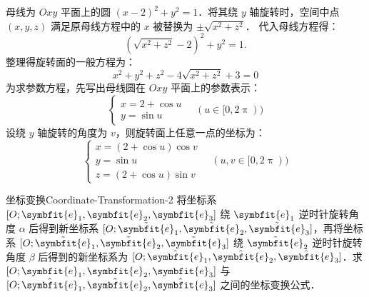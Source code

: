 \begin{solution}
    母线为 $Oxy$ 平面上的圆 $(x - 2)^2 + y^2 = 1$．将其绕 $y$ 轴旋转时，空间中点 $(x, y, z)$ 满足原母线方程中的 $x$ 被替换为 $\pm \sqrt{x^2 + z^2}$．
    代入母线方程得：
    \begin{equation}
        (\sqrt{x^2 + z^2} - 2)^2 + y^2 = 1.
    \end{equation}
    整理得旋转面的一般方程为：
    \begin{equation}
        \boxed{x^2 + y^2 + z^2 - 4\sqrt{x^2 + z^2} + 3 = 0}
    \end{equation}
    为求参数方程，先写出母线圆在 $Oxy$ 平面上的参数表示：
    \begin{equation}
        \begin{cases}
            x = 2 + \cos u \\
            y = \sin u
        \end{cases} \quad (u \in [0, 2\uppi))
    \end{equation}
    设绕 $y$ 轴旋转的角度为 $v$，则旋转面上任意一点的坐标为：
    \begin{equation}
        \boxed{\begin{cases}
            x = (2 + \cos u) \cos v \\
            y = \sin u              \\
            z = (2 + \cos u) \sin v
        \end{cases} \quad (u, v \in [0, 2\uppi))}
    \end{equation}
\end{solution}


\begin{problem}{坐标变换}{Coordinate-Transformation-2}
    将坐标系 $[O; \symbfit{e}_1, \symbfit{e}_2, \symbfit{e}_3]$ 绕 $\symbfit{e}_1$ 逆时针旋转角度 $\alpha$ 后得到新坐标系 $[O; \tilde{\symbfit{e}}_1, \tilde{\symbfit{e}}_2, \tilde{\symbfit{e}}_3]$，再将坐标系 $[O; \tilde{\symbfit{e}}_1, \tilde{\symbfit{e}}_2, \tilde{\symbfit{e}}_3]$ 绕 $\tilde{\symbfit{e}}_2$ 逆时针旋转角度 $\beta$ 后得到的新坐标系为 $[O; \hat{\symbfit{e}}_1, \hat{\symbfit{e}}_2, \hat{\symbfit{e}}_3]$．求 $[O; \symbfit{e}_1, \symbfit{e}_2, \symbfit{e}_3]$ 与 $[O; \hat{\symbfit{e}}_1, \hat{\symbfit{e}}_2, \hat{\symbfit{e}}_3]$ 之间的坐标变换公式．
\end{problem}


